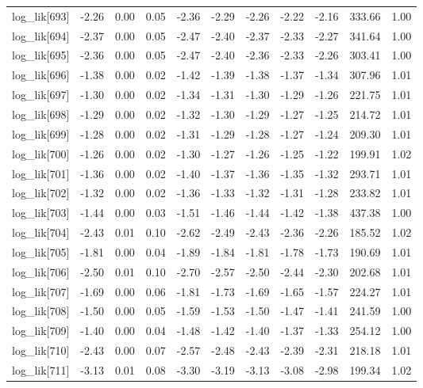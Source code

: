 \begin{table}[ht]
\begin{tabular}{rrrrrrrrrrr}
  log\_lik[693] & -2.26 & 0.00 & 0.05 & -2.36 & -2.29 & -2.26 & -2.22 & -2.16 & 333.66 & 1.00 \\ 
  log\_lik[694] & -2.37 & 0.00 & 0.05 & -2.47 & -2.40 & -2.37 & -2.33 & -2.27 & 341.64 & 1.00 \\ 
  log\_lik[695] & -2.36 & 0.00 & 0.05 & -2.47 & -2.40 & -2.36 & -2.33 & -2.26 & 303.41 & 1.00 \\ 
  log\_lik[696] & -1.38 & 0.00 & 0.02 & -1.42 & -1.39 & -1.38 & -1.37 & -1.34 & 307.96 & 1.01 \\ 
  log\_lik[697] & -1.30 & 0.00 & 0.02 & -1.34 & -1.31 & -1.30 & -1.29 & -1.26 & 221.75 & 1.01 \\ 
  log\_lik[698] & -1.29 & 0.00 & 0.02 & -1.32 & -1.30 & -1.29 & -1.27 & -1.25 & 214.72 & 1.01 \\ 
  log\_lik[699] & -1.28 & 0.00 & 0.02 & -1.31 & -1.29 & -1.28 & -1.27 & -1.24 & 209.30 & 1.01 \\ 
  log\_lik[700] & -1.26 & 0.00 & 0.02 & -1.30 & -1.27 & -1.26 & -1.25 & -1.22 & 199.91 & 1.02 \\ 
  log\_lik[701] & -1.36 & 0.00 & 0.02 & -1.40 & -1.37 & -1.36 & -1.35 & -1.32 & 293.71 & 1.01 \\ 
  log\_lik[702] & -1.32 & 0.00 & 0.02 & -1.36 & -1.33 & -1.32 & -1.31 & -1.28 & 233.82 & 1.01 \\ 
  log\_lik[703] & -1.44 & 0.00 & 0.03 & -1.51 & -1.46 & -1.44 & -1.42 & -1.38 & 437.38 & 1.00 \\ 
  log\_lik[704] & -2.43 & 0.01 & 0.10 & -2.62 & -2.49 & -2.43 & -2.36 & -2.26 & 185.52 & 1.02 \\ 
  log\_lik[705] & -1.81 & 0.00 & 0.04 & -1.89 & -1.84 & -1.81 & -1.78 & -1.73 & 190.69 & 1.01 \\ 
  log\_lik[706] & -2.50 & 0.01 & 0.10 & -2.70 & -2.57 & -2.50 & -2.44 & -2.30 & 202.68 & 1.01 \\ 
  log\_lik[707] & -1.69 & 0.00 & 0.06 & -1.81 & -1.73 & -1.69 & -1.65 & -1.57 & 224.27 & 1.01 \\ 
  log\_lik[708] & -1.50 & 0.00 & 0.05 & -1.59 & -1.53 & -1.50 & -1.47 & -1.41 & 241.59 & 1.00 \\ 
  log\_lik[709] & -1.40 & 0.00 & 0.04 & -1.48 & -1.42 & -1.40 & -1.37 & -1.33 & 254.12 & 1.00 \\ 
  log\_lik[710] & -2.43 & 0.00 & 0.07 & -2.57 & -2.48 & -2.43 & -2.39 & -2.31 & 218.18 & 1.01 \\ 
  log\_lik[711] & -3.13 & 0.01 & 0.08 & -3.30 & -3.19 & -3.13 & -3.08 & -2.98 & 199.34 & 1.02 \\ 

\end{tabular}
\end{table}
